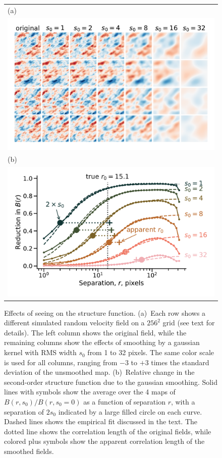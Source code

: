 \documentclass[fleqn,usenatbib, useAMS, a4paper]{mnras}
\begin{document}
\begin{figure}
  \begin{tabular}{@{} l @{}}
    (a)\\
    \includegraphics[width=\linewidth]{Figures/fake-seeing-nonp-thumbnails}\\
    (b)\\
    \includegraphics[width=\linewidth]{Figures/fake-seeing-nonp-reduction}
  \end{tabular}
  \caption{Effects of seeing on the structure function.
    (a)~Each row shows a different simulated random velocity field on a \(256^2\) grid
    (see text for details).
    The left column shows the original field,
    while the remaining columns show the effects of smoothing by a gaussian kernel
    with RMS width \(s_0\) from 1 to 32 pixels.
    The same color scale is used for all columns, ranging from \(-3\) to \(+3\) times
    the standard deviation of the unsmoothed map.
    (b)~Relative change in the second-order structure function due to the gaussian smoothing.
    Solid lines with symbols show the average over the 4 maps of
    \(B(r, s_0) / B(r, s_0 = 0)\) as a function of separation \(r\),
    with a separation of \(2 s_0\) indicated by a large filled circle on each curve.
    Dashed lines shows the empirical fit discussed in the text.
    The dotted line shows the correlation length of the original fields,
    while colored plus symbols show the apparent correlation length of the smoothed fields.
  }
  \label{fig:seeing-reduction}
\end{figure}
\end{document}
